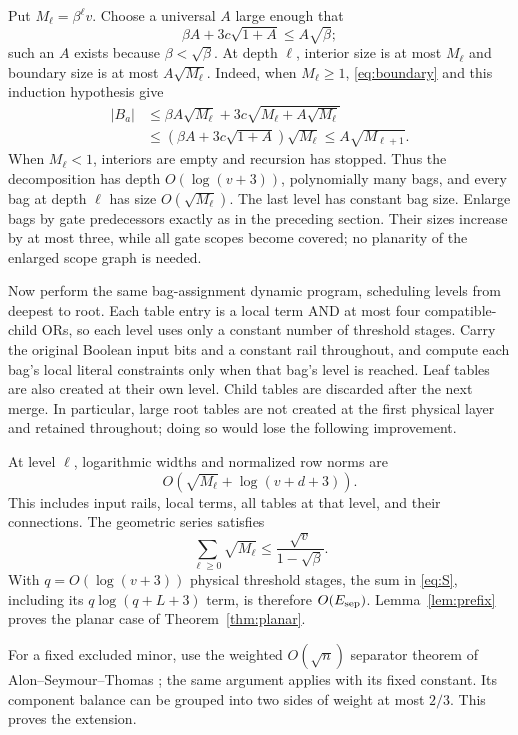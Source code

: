\documentclass[11pt]{article}
\theoremstyle{remark}\newtheorem{remark}[theorem]{Remark}
\begin{document}
Put $M_\ell=\beta^\ell v$. Choose a universal $A$ large enough that
\[
 \beta A+3c\sqrt{1+A}\le A\sqrt\beta;
\]
such an $A$ exists because $\beta<\sqrt\beta$.
At depth $\ell$, interior size is at most $M_\ell$ and boundary
size is at most $A\sqrt{M_\ell}$. Indeed, when $M_\ell\ge1$,
\eqref{eq:boundary} and this induction hypothesis give
\begin{align*}
 |B_a|&\le\beta A\sqrt{M_\ell}
                 +3c\sqrt{M_\ell+A\sqrt{M_\ell}}\\
 &\le(\beta A+3c\sqrt{1+A})\sqrt{M_\ell}
 \le A\sqrt{M_{\ell+1}}.
\end{align*}
When $M_\ell<1$, interiors are empty and recursion has stopped.
Thus the decomposition has depth $O(\log(v+3))$, polynomially many
bags, and every bag at depth $\ell$ has size
$O(\sqrt{M_\ell})$. The last level has constant bag size.
Enlarge bags by gate predecessors exactly as in the preceding
section. Their sizes increase by at most three, while all gate
scopes become covered; no planarity of the enlarged scope graph
is needed.

Now perform the same bag-assignment dynamic program, scheduling
levels from deepest to root. Each table entry is a local term AND
at most four compatible-child ORs, so each level uses only a
constant number of threshold stages. Carry the original Boolean
input bits and a constant rail throughout, and compute each bag's
local literal constraints only when that bag's level is reached.
Leaf tables are also created at their own level. Child tables are
discarded after the next merge. In particular, large root tables
are not created at the first physical layer and retained throughout;
doing so would lose the following improvement.

At level $\ell$, logarithmic widths and normalized row norms are
\[
 O(\sqrt{M_\ell}+\log(v+d+3)).
\]
This includes input rails, local terms, all tables at that level,
and their connections. The geometric series satisfies
\[
 \sum_{\ell\ge0}\sqrt{M_\ell}
       \le\frac{\sqrt v}{1-\sqrt\beta}.
\]
With $q=O(\log(v+3))$ physical threshold stages, the sum in
\eqref{eq:S}, including its $q\log(q+L+3)$ term, is therefore
$O(E_{\rm sep})$. Lemma~\ref{lem:prefix} proves the planar case of
Theorem~\ref{thm:planar}.

For a fixed excluded minor, use the weighted
$O(\sqrt n)$ separator theorem of Alon--Seymour--Thomas
\cite{ast}; the same argument applies with its fixed constant.
Its component balance can be grouped into two sides of weight at
most $2/3$. This proves the extension.
\end{document}

